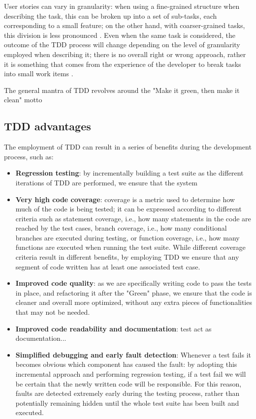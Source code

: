 User stories can vary in granularity: when using a fine-grained structure when describing the task, this can be broken up into a set of sub-tasks, each corresponding to a small feature; on the other hand, with coarser-grained tasks, this division is less pronounced \cite{DBLP:journals/tse/KaracTJ21}. Even when the same task is considered, the outcome of the TDD process will change depending on the level of granularity employed when describing it; there is no overall right or wrong approach, rather it is something that comes from the experience of the developer to break tasks into small work items \cite{DBLP:journals/tse/KaracTJ21}.

The general mantra of TDD revolves around the "Make it green, then make it clean" motto

\subsection{TDD advantages}
The employment of TDD can result in a series of benefits during the development process, such as:
\begin{itemize}
    \item \textbf{Regression testing}: by incrementally building a test suite as the different iterations of TDD are performed, we ensure that the system  
    \item \textbf{Very high code coverage}: coverage is a metric used to determine how much of the code is being tested; it can be expressed according to different criteria such as statement coverage, i.e., how many statements in the code are reached by the test cases, branch coverage, i.e., how many conditional branches are executed during testing, or function coverage, i.e., how many functions are executed when running the test suite. While different coverage criteria result in different benefits, by employing TDD we ensure that any segment of code written has at least one associated test case.
    \item \textbf{Improved code quality}: as we are specifically writing code to pass the tests in place, and refactoring it after the "Green" phase, we ensure that the code is cleaner and overall more optimized, without any extra pieces of functionalities that may not be needed. 
    \item \textbf{Improved code readability and documentation}: test act as documentation...
    \item \textbf{Simplified debugging and early fault detection}: Whenever a test fails it becomes obvious which component has caused the fault: by adopting this incremental approach and performing regression testing, if a test fail we will be certain that the newly written code will be responsible. For this reason, faults are detected extremely early during the testing process, rather than potentially remaining hidden until the whole test suite has been built and executed.
\end{itemize}


